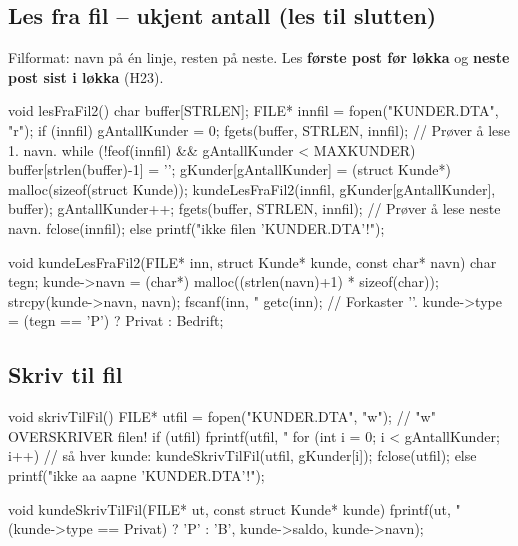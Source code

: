 \subsection{Les fra fil -- ukjent antall (les til slutten)}
Filformat: navn på én linje, resten på neste. Les \textbf{første post før løkka} og \textbf{neste post sist i løkka} (H23).
\begin{kode}
void lesFraFil2()  {
  char buffer[STRLEN];
  FILE* innfil = fopen("KUNDER.DTA", "r");
  if (innfil)  {
     gAntallKunder = 0;
     fgets(buffer, STRLEN, innfil);                    //  Prøver å lese 1. navn.
     while (!feof(innfil)  &&  gAntallKunder < MAXKUNDER)  {
       buffer[strlen(buffer)-1] = '\0';
       gKunder[gAntallKunder] = (struct Kunde*) malloc(sizeof(struct Kunde));
       kundeLesFraFil2(innfil, gKunder[gAntallKunder], buffer);
       gAntallKunder++;
       fgets(buffer, STRLEN, innfil);                  //  Prøver å lese neste navn.
     }
     fclose(innfil);
  } else
     printf("\n\tFant ikke filen 'KUNDER.DTA'!\n");
}

void kundeLesFraFil2(FILE* inn, struct Kunde* kunde, const char* navn)  {
  char tegn;
  kunde->navn = (char*) malloc((strlen(navn)+1) * sizeof(char));
  strcpy(kunde->navn, navn);
  fscanf(inn, "%
  getc(inn);                                           //  Forkaster '\n'.
  kunde->type = (tegn == 'P') ? Privat : Bedrift;
}
\end{kode}

\subsection{Skriv til fil}\label{sec:skrivfil}
\begin{kode}
void skrivTilFil()  {
  FILE* utfil = fopen("KUNDER.DTA", "w");              //  "w" OVERSKRIVER filen!
  if (utfil)  {
     fprintf(utfil, "%
     for (int i = 0;  i < gAntallKunder;  i++)         //    så hver kunde:
         kundeSkrivTilFil(utfil, gKunder[i]);
     fclose(utfil);
  } else
     printf("\n\tKlarte ikke aa aapne 'KUNDER.DTA'!\n");
}

void kundeSkrivTilFil(FILE* ut, const struct Kunde* kunde)  {
  fprintf(ut, "%
          (kunde->type == Privat) ? 'P' : 'B', kunde->saldo, kunde->navn);
}
\end{kode}

